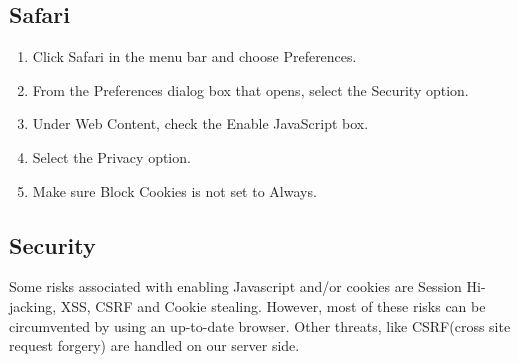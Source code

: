 \documentclass[hidelinks,english]{article}
\begin{document}
        \subsection{Safari}
            \begin{enumerate}
                \item Click Safari in the menu bar and choose Preferences.
                \item From the Preferences dialog box that opens, select the Security option.
                \item Under Web Content, check the Enable JavaScript box.
                \item Select the Privacy option.
                \item Make sure Block Cookies is not set to Always.
            \end{enumerate}
            \begin{center}
            \end{center}
        \subsection{Security}
            Some risks associated with enabling Javascript and/or cookies are Session Hi-jacking, XSS, CSRF and Cookie stealing. However, most of these risks can be circumvented by using an up-to-date browser. Other threats, like CSRF(cross site request forgery) are handled on our server side.
\end{document}
